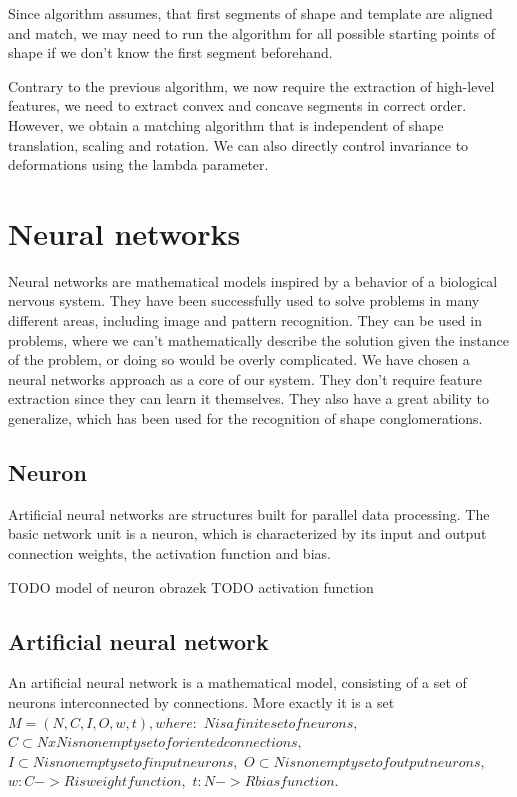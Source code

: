 Since algorithm assumes, that first segments of shape and template are aligned and match, we may need to run the algorithm for all possible starting points of shape if we don't know the first segment beforehand.

Contrary to the previous algorithm, we now require the extraction of high-level features, we need to extract convex and concave segments in correct order. However, we obtain a matching algorithm that is independent of shape translation, scaling and rotation. We can also directly control invariance to deformations using the lambda parameter.

\chapter{Neural networks}
Neural networks are mathematical models inspired by a behavior of a biological nervous system. They have been successfully used to solve problems in many different areas, including image and pattern recognition. They can be used in problems, where we can't mathematically describe the solution given the instance of the problem, or doing so would be overly complicated. We have chosen a neural networks approach as a core of our system. They don't require feature extraction since they can learn it themselves. They also have a great ability to generalize, which has been used for the recognition of shape conglomerations.

\section{Neuron}
Artificial neural networks are structures built for parallel data processing. The basic network unit is a neuron, which is characterized by its input and output connection weights, the activation function and bias.

TODO model of neuron obrazek
TODO activation function

\section{Artificial neural network}
An artificial neural network is a mathematical model, consisting of a set of neurons interconnected by connections.
More exactly it is a set 
$
M  =  (N,C,I,O,w,t), where: $
 $N is a finite set of neurons,$
 $C \subset N x N is nonempty set of oriented connections,$
$I \subset N is nonempty set of input neurons,$
$O \subset N is nonempty set of output neurons,$
$w : C -> R is weight function, $
$t : N->R bias function.$

